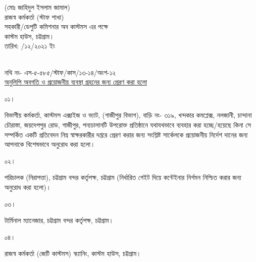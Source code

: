 \documentclass[12pt]{article}
\newcommand{\fileno}{নথি নং- এস-৫-৫৮৫/স্টাফ/কাস/১৩-১৪/অংশ-১২}
\newcommand{\rodt}{তারিখ: \hspace{2.0em}/১২/২০২১ ইং}
\begin{document}
\begin{minipage}[t]{0.40\linewidth}
\begin{center}
\footnotesize{(মোঃ জাহিদুল ইসলাম জামাল)}
\\
\footnotesize{রাজস্ব কর্মকর্তা (স্টাফ শাখা)}
\\
\scriptsize{সহকারী/ডেপুটি কমিশনার অব কাস্টমস এর পক্ষে}
\\
\scriptsize{কাস্টম হাউস, চট্টগ্রাম।}
\\
\scriptsize{{\rodt}}
\end{center}
\end{minipage}
\\
\scriptsize{{\fileno}}
\\
\underline{\scriptsize{অনুলিপি অবগতি ও প্রয়োজনীয় ব্যবস্থা গ্রহনের জন্য প্রেরণ করা হলো}}
\\
\begin{minipage}[t]{0.06\linewidth}
\scriptsize{০১।}
\end{minipage}
\begin{minipage}[t]{0.94\linewidth}
\scriptsize{বিভাগীয় কর্মকর্তা, কাস্টমস এক্সাইজ ও ভ্যাট, (গাজীপুর বিভাগ),
বাড়ি নং- ৩১৯,
খন্দকার কমপ্লেক্স, নলজানী,
চান্দানা চৌরাস্তা, জয়দেপপুর রোড,
গাজীপুর,
পন্যচালানটি উপরোক্ত প্রতিষ্ঠানে যথাযথভাবে
ব্যবহার করা হচ্ছে/হয়েছে কিনা সে
সম্পর্কিত একটি প্রতিবেদন নিম্ন স্বাক্ষরকারীর
দপ্তরে প্রেরণ করার জন্য সংশ্লিষ্ট সার্কেলকে
প্রয়োজনীয় নির্দেশ দানের জন্য আপনাকে
বিশেষভাবে অনুরোধ করা হলো।
}
\end{minipage}
\begin{minipage}[t]{0.06\linewidth}
\scriptsize{০২।}
\end{minipage}
\begin{minipage}[t]{0.94\linewidth}
\scriptsize{পরিচালক (নিরাপত্তা), চট্টগ্রাম বন্দর কর্তৃপক্ষ, চট্টগ্রাম (নির্ধারিত গেইট দিয়ে কন্টেইনার নির্গমন নিশ্চিত করার জন্য অনুরোধ করা হলো)।}
\end{minipage}
\begin{minipage}[t]{0.06\linewidth}
\scriptsize{০৩।}
\end{minipage}
\begin{minipage}[t]{0.94\linewidth}
\scriptsize{টার্মিনাল ম্যানেজার, চট্টগ্রাম বন্দর কর্তৃপক্ষ, চট্টগ্রাম।}
\end{minipage}
\begin{minipage}[t]{0.06\linewidth}
\scriptsize{০৪।}
\end{minipage}
\begin{minipage}[t]{0.94\linewidth}
\scriptsize{রাজস্ব কর্মকর্তা (জেটি কাস্টমস) স্ক্যানিং, কাস্টম হাউস, চট্টগ্রাম।}
\end{minipage}
\end{document}
